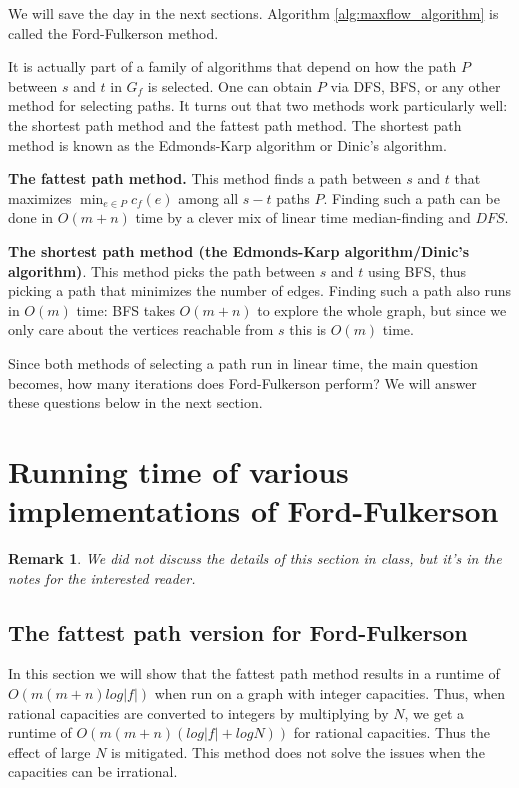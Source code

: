 \documentclass [12pt]{article}
\newtheorem{remark}{Remark}
\theoremstyle{definition}
\begin{document}
We will save the day in the next sections. Algorithm \ref{alg:maxflow_algorithm} is called the Ford-Fulkerson method.

It is actually part of a family of algorithms that depend on how the path $P$ between $s$ and $t$ in $G_f$ is selected. One can obtain $P$ via DFS, BFS, or any other method for selecting paths. It turns out that two methods work particularly well: the shortest path method and the fattest path method. The shortest path method is known as the Edmonds-Karp algorithm or Dinic's algorithm. 

\textbf{The fattest path method.} This method finds a path between $s$ and $t$ that maximizes $\min_{e \in P} c_f (e)$ among all $s-t$ paths $P$. Finding such a path can be done in $O(m + n)$ time by a clever mix of linear time median-finding and $DFS$. 


\textbf{The shortest path method (the Edmonds-Karp algorithm/Dinic's algorithm)}. This method picks the path between $s$ and $t$ using BFS, thus picking a path that minimizes the number of edges. Finding such a path also runs in $O(m)$ time: BFS takes $O(m + n)$ to explore the whole graph, but since we only care about the vertices reachable from $s$ this is $O(m)$ time. 

Since both methods of selecting a path run in linear time, the main question becomes, how many iterations does Ford-Fulkerson perform? We will answer these questions below in the next section.

\section{Running time of various implementations of Ford-Fulkerson}
\begin{remark}
We did not discuss the details of this section in class, but it's in the notes for the interested reader.
\end{remark}

\subsection{The fattest path version for Ford-Fulkerson} 

In this section we will show that the fattest path method results in a runtime of $O(m(m + n) log |f |)$ when run on a graph with integer capacities. Thus, when rational capacities are converted to integers by multiplying by $N$, we get a runtime of $O(m(m + n)(log |f | + log N))$ for rational capacities. Thus the effect of large $N$ is mitigated. This method does not solve the issues when the capacities can be irrational. 
\end{document}
